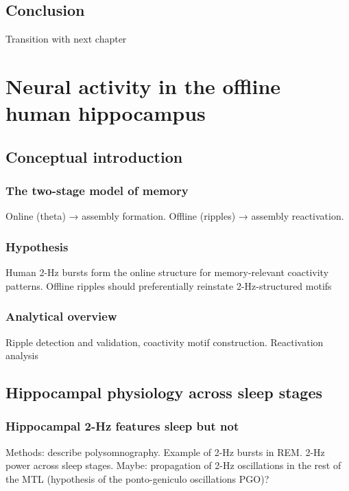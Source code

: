 \documentclass[12pt,a4paper]{report}
\newcommand{\gs}[1]{\glsentryshort{#1}}  %
\begin{document}
\section{Conclusion}
Transition with next chapter

\chapter{Neural activity in the offline human hippocampus} %

\section{Conceptual introduction}
\subsection{The two-stage model of memory}
Online (theta) → assembly formation. Offline (ripples) → assembly reactivation.

\subsection{Hypothesis}
Human 2-Hz bursts form the online structure for memory-relevant coactivity patterns. Offline ripples should preferentially reinstate 2-Hz-structured motifs

\subsection{Analytical overview}
Ripple detection and validation, coactivity motif construction. Reactivation analysis

\section{Hippocampal physiology across sleep stages}
\subsection{Hippocampal 2-Hz features \gs{rem} sleep but not \gs{sws}}
Methods: describe polysomnography. Example of 2-Hz bursts in REM. 2-Hz power across sleep stages. Maybe: propagation of 2-Hz oscillations in the rest of the MTL (hypothesis of the ponto-geniculo oscillations PGO)? 
\end{document}
